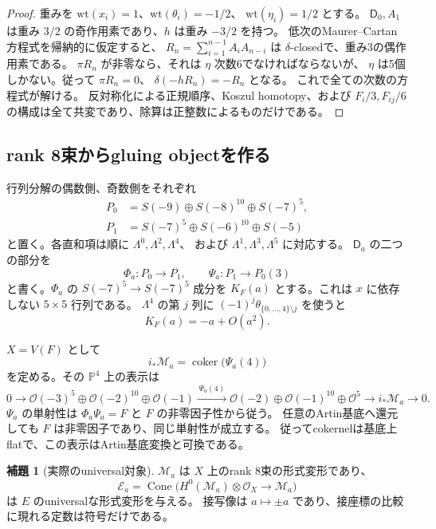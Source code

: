\documentclass[a4paper,11pt]{ltjsarticle}
\theoremstyle{definition}
\newtheorem{lemma}[theorem]{補題}
\newcommand{\OO}{\mathcal O}
\newcommand{\PP}{\mathbb P}
\begin{document}
\begin{proof}
重みを $\mathrm{wt}(x_i)=1$、$\mathrm{wt}(\theta_i)=-1/2$、
$\mathrm{wt}(\eta_i)=1/2$ とする。
$\mathsf D_0,A_1$ は重み $3/2$ の奇作用素であり、$h$ は重み $-3/2$ を持つ。
低次のMaurer--Cartan方程式を帰納的に仮定すると、
$R_n=\sum_{i=1}^{n-1}A_iA_{n-i}$ は $\delta$-closedで、重み3の偶作用素である。
$\pi R_n$ が非零なら、それは $\eta$ 次数6でなければならないが、
$\eta$ は5個しかない。従って $\pi R_n=0$、
$\delta(-hR_n)=-R_n$ となる。
これで全ての次数の方程式が解ける。
反対称化による正規順序、Koszul homotopy、および
$F_i/3,F_{ij}/6$ の構成は全て共変であり、除算は正整数によるものだけである。
\end{proof}

\subsection{rank 8束からgluing objectを作る}

行列分解の偶数側、奇数側をそれぞれ
\[
 \begin{aligned}
 P_0&=S(-9)\oplus S(-8)^{10}\oplus S(-7)^5,\\
 P_1&=S(-7)^5\oplus S(-6)^{10}\oplus S(-5)
 \end{aligned}
\]
と置く。各直和項は順に $\Lambda^0,\Lambda^2,\Lambda^4$、
および $\Lambda^1,\Lambda^3,\Lambda^5$ に対応する。
$\mathsf D_a$ の二つの部分を
\[
 \Phi_a:P_0\longrightarrow P_1,
 \qquad \Psi_a:P_1\longrightarrow P_0(3)
\]
と書く。$\Phi_a$ の $S(-7)^5\to S(-7)^5$ 成分を
$K_F(a)$ とする。これは $x$ に依存しない $5\times5$ 行列である。
$\Lambda^4$ の第 $j$ 列に $(-1)^j\theta_{\{0,\ldots,4\}\setminus j}$ を使うと
\[
                         K_F(a)=-a+O(a^2).
 \tag{T4}\label{eq:tate-K-linear}
\]

$X=V(F)$ として
\[
 i_*\mathcal M_a=\operatorname{coker}\bigl(\Psi_a(4)\bigr)
\]
を定める。その $\PP^4$ 上の表示は
\[
 0\longrightarrow
 \OO(-3)^5\oplus\OO(-2)^{10}\oplus\OO(-1)
 \xrightarrow{\ \Psi_a(4)\ }
 \OO(-2)\oplus\OO(-1)^{10}\oplus\OO^5
 \longrightarrow i_*\mathcal M_a\longrightarrow0.
 \tag{T5}\label{eq:tate-bundle-resolution}
\]
$\Psi_a$ の単射性は $\Phi_a\Psi_a=F$ と $F$ の非零因子性から従う。
任意のArtin基底へ還元しても $F$ は非零因子であり、同じ単射性が成立する。
従ってcokernelは基底上flatで、この表示はArtin基底変換と可換である。

\begin{lemma}[実際のuniversal対象]\label{lem:tate-universal-object}
$\mathcal M_a$ は $X$ 上のrank 8束の形式変形であり、
\[
 \mathcal E_a=\operatorname{Cone}\bigl(
 H^0(\mathcal M_a)\otimes\OO_X\longrightarrow\mathcal M_a\bigr)
 \tag{T6}\label{eq:tate-evaluation-object}
\]
は $E$ のuniversalな形式変形を与える。
接写像は $a\mapsto\pm a$ であり、接座標の比較に現れる定数は符号だけである。
\end{lemma}
\end{document}
